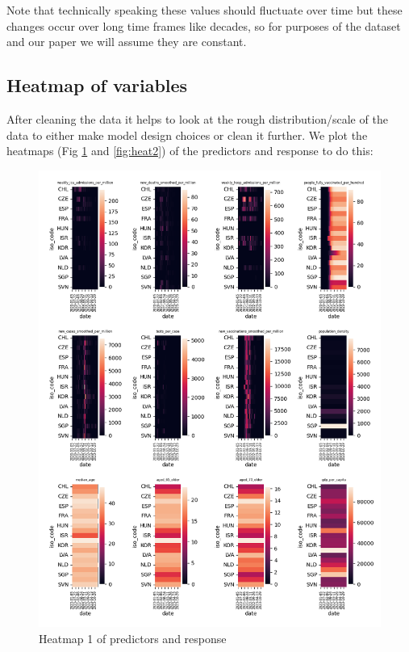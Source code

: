 \documentclass{article}
\begin{document}
Note that technically speaking these values should fluctuate over time but these changes occur over long time frames like decades, so for purposes of the dataset and our paper we will assume they are constant.

\subsection{Heatmap of variables}

After cleaning the data it helps to look at the rough distribution/scale of the data to either make model design choices or clean it further. We plot the heatmaps (Fig \ref{fig:heat1} and \ref{fig:heat2}) of the predictors and response to do this:

\begin{figure}
\centering
\includegraphics[width=1\linewidth]{heatmap_plot1.png}
\caption{\label{fig:heat1}Heatmap 1 of predictors and response}
\end{figure}
\end{document}
